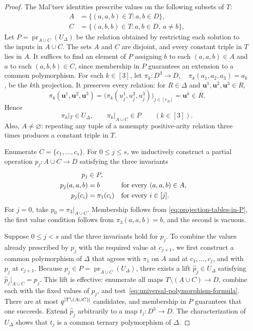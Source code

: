 \documentclass[11pt,letterpaper,onecolumn]{article}
\theoremstyle{plain}
\theoremstyle{definition}
\theoremstyle{remark}
\DeclareMathOperator{\pr}{pr}
\DeclarePairedDelimiter{\abs}{\lvert}{\rvert}
\begin{document}
\begin{proof}
The Mal'tsev identities prescribe values on the following subsets of $T$:
\begin{equation*}
  \begin{aligned}
    A&=\{(a,a,b)\in T:a,b\in D\},\\
    C&=\{(a,b,b)\in T:a,b\in D,\ a\ne b\},
  \end{aligned}
\end{equation*}
Let $P=\pr_{A\cup C}(U_\Delta)$ be the relation obtained by restricting
each solution to the inputs in $A\cup C$.  The sets $A$ and $C$ are
disjoint, and every constant triple in $T$ lies in $A$.
It suffices to find an element of $P$ assigning $b$ to each $(a,a,b)\in A$
and $a$ to each $(a,b,b)\in C$, since membership in $P$ guarantees an
extension to a common polymorphism.
For each $k\in[3]$,
let $\pi_k:D^3\to D, \quad \pi_k(a_1,a_2,a_3)=a_k$, be the $k$th projection.  It preserves every relation:
for $R\in\Delta$ and
$\mathbf u^1,\mathbf u^2,\mathbf u^3\in R$,
\[
  \pi_k(\mathbf u^1,\mathbf u^2,\mathbf u^3)
  =\bigl(\pi_k(u^1_j,u^2_j,u^3_j)\bigr)_{j\in[r_R]}
  =\mathbf u^k\in R.
\]
Hence
\begin{equation}
  \pi_k|_T\in U_\Delta,
  \qquad
  \pi_k|_{A\cup C}\in P
  \qquad(k\in[3]).
  \label{eq:projection-tables-in-P}
\end{equation}
Also, $A\ne\varnothing$: repeating any tuple of a nonempty
positive-arity relation three times produces a constant triple in $T$.

Enumerate $C=\{c_1,\ldots,c_s\}$.  For $0\le j\le s$, we inductively
construct a partial operation $p_j:A\cup C\to D$ satisfying the three
invariants
\begin{align}
  p_j&\in P,
    \notag\\
  p_j(a,a,b)&=b
    &&\text{for every }(a,a,b)\in A,
    \notag\\
  p_j(c_i)&=\pi_1(c_i)
    &&\text{for every }i\in[j].
    \label{eq:partial-maltsev-c}
\end{align}
For $j=0$, take $p_0=\pi_3|_{A\cup C}$.  Membership follows from
\eqref{eq:projection-tables-in-P}, the first value condition follows from
$\pi_3(a,a,b)=b$, and the second is vacuous.

Suppose $0\le j<s$ and the three invariants hold for $p_j$.
To combine the values already prescribed by $p_j$ with the required value
at $c_{j+1}$, we first construct a common polymorphism of $\Delta$ that
agrees with $\pi_1$ on $A$ and at $c_1,\ldots,c_j$, and with $p_j$ at
$c_{j+1}$.  Because $p_j\in P=\pr_{A\cup C}(U_\Delta)$, there exists a lift $\widehat p_j\in U_\Delta$ satisfying $\widehat p_j|_{A\cup C}=p_j$. This lift is effective: enumerate all maps
$T\setminus(A\cup C)\to D$, combine each with the fixed values of $p_j$,
and test~\eqref{eq:universal-polymorphism-formula}.  There are at most
$q^{\abs{T\setminus(A\cup C)}}$ candidates, and membership in $P$ guarantees
that one succeeds.  Extend $\widehat p_j$ arbitrarily to a map $t_j:D^3\to D$.
The characterization of $U_\Delta$ shows that $t_j$ is a common ternary
polymorphism of $\Delta$.


\end{proof}
\end{document}
